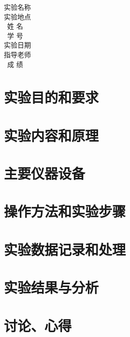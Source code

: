 \documentclass{article}
\begin{document}
\begin{titlepage}
    \begin{center}
    \Large
            实验名称\ \ \underline{} \\ 
            \vspace{0.3cm}
            实验地点\ \ \underline{}\\
            \vspace{0.3cm}
            \quad\ 姓\; 名 \ \ \underline{}\\
            \vspace{0.3cm}
            \quad\ 学\; 号\ \ \underline{}\\
            \vspace{0.3cm}
            实验日期\ \ \underline{}\\
            \vspace{0.3cm}
            指导老师\ \ \underline{}\\
            \vspace{0.3cm}
            \quad\ 成\; 绩\ \ \underline{\makebox[220pt]{}}\\

              
            

             
    \end{center}
        
    
\end{titlepage}

\newpage
\tableofcontents
\thispagestyle{empty}%
\thispagestyle{empty}%

\newpage
{}%

\section{实验目的和要求}
\section{实验内容和原理}
\section{主要仪器设备}
\section{操作方法和实验步骤}
\section{实验数据记录和处理}
\section{实验结果与分析}
\section{讨论、心得}
\end{document}
